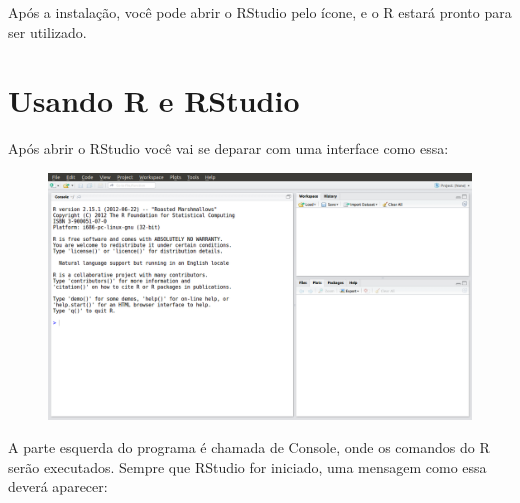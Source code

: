 \documentclass[a4paper,12pt]{article}\usepackage[]{graphicx}\usepackage[]{color}
\providecommand{\R}{\textsf{R}\xspace}
\providecommand{\RStudio}{\textsf{RStudio}\xspace}
\begin{document}
Após a instalação, você pode abrir o \RStudio pelo ícone, e o \R estará
pronto para ser utilizado.

\section{Usando \R e \RStudio}

Após abrir o \RStudio você vai se deparar com uma interface como essa:

\begin{figure}[H]
  \centering
  \includegraphics[width=\textwidth]{figure/RStudio_002}
\end{figure}

\clearpage

A parte esquerda do programa é chamada de \textsf{Console}, onde os
comandos do \R serão executados. Sempre que \RStudio for iniciado, uma
mensagem como essa deverá aparecer:

%
%
%
%
%
\end{document}
